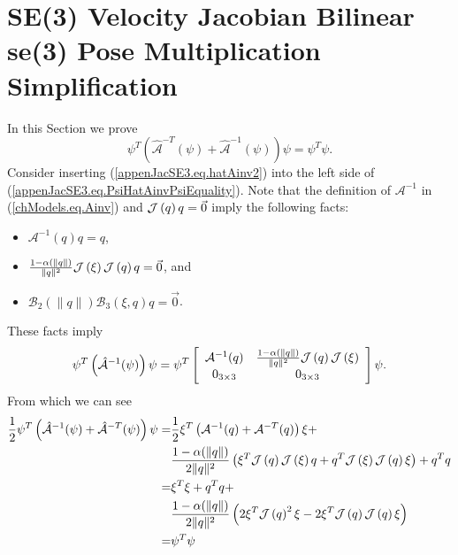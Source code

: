 \section{SE(3) Velocity Jacobian Bilinear se(3) Pose Multiplication Simplification}
\label{appenJacSE3.sec.PsiHatAinvPsiEquality}

In this Section we prove
%
\begin{equation}\label{appenJacSE3.eq.PsiHatAinvPsiEquality}
\psi^T\left(\hat{\mathcal{A}}^{-T}(\psi)+\hat{\mathcal{A}}^{-1}(\psi)\right)\psi=\psi^T\psi.
\end{equation}
%
Consider inserting (\ref{appenJacSE3.eq.hatAinv2}) into the left side
of (\ref{appenJacSE3.eq.PsiHatAinvPsiEquality}).  
%
Note that the definition of $\mathcal{A}^{-1}$ in (\ref{chModels.eq.Ainv}) and
$\mathcal{J}\left( q \right)q=\vec{0}$ imply the following facts:
\begin{itemize}
\item$\mathcal{A}^{-1}(q)q=q$,
\item$\frac{1-\alpha(\|q\|)}{\|q\|^2}\mathcal{J}\left( \xi \right)\mathcal{J}\left( q \right)q=\vec{0}$, and
\item $\mathcal{B}_2(\|q\|)\mathcal{B}_3\left( \xi, q\right)q=\vec{0}$.
\end{itemize}
%
These facts imply
%
\begin{equation}
\psi^T\left(\hat{\mathcal{A}}^{-1}(\psi)\right)\psi=\psi^T
\left[ \begin{array}{cc}
     \mathcal{A}^{-1}(q) & \frac{1-\alpha(\|q\|)}{\|q\|^2}\mathcal{J}\left( q \right)\mathcal{J}\left( \xi \right) \\
      0_{3 \times 3}     & 0_{3 \times 3}   \\
\end{array} \right]\psi.
\end{equation}
%
From which we can see
%
\begin{align}
\frac{1}{2}\psi^T\left(\hat{\mathcal{A}}^{-1}(\psi)+\hat{\mathcal{A}}^{-T}(\psi)\right)\psi
=&\frac{1}{2}\xi^T\left(\mathcal{A}^{-1}(q)+\mathcal{A}^{-T}(q)\right)\xi+
\nonumber \\
&\frac{1-\alpha(\|q\|)}{2 \|q\|^2}\left(\xi^T\mathcal{J}\left( q \right)\mathcal{J}\left( \xi \right)q+
q^T \mathcal{J}\left( \xi \right)\mathcal{J}\left( q \right)\xi\right)+q^Tq
\nonumber \\
=&\xi^T \xi+q^T q+
\nonumber \\
 &\frac{1-\alpha(\|q\|)}{2 \|q\|^2}\left(2\xi^T \mathcal{J}\left( q \right)^2 \xi- 
2\xi^T \mathcal{J}\left( q \right)\mathcal{J}\left( q \right)\xi\right)
\nonumber \\
=&\psi^T\psi
\nonumber
\end{align}
%
